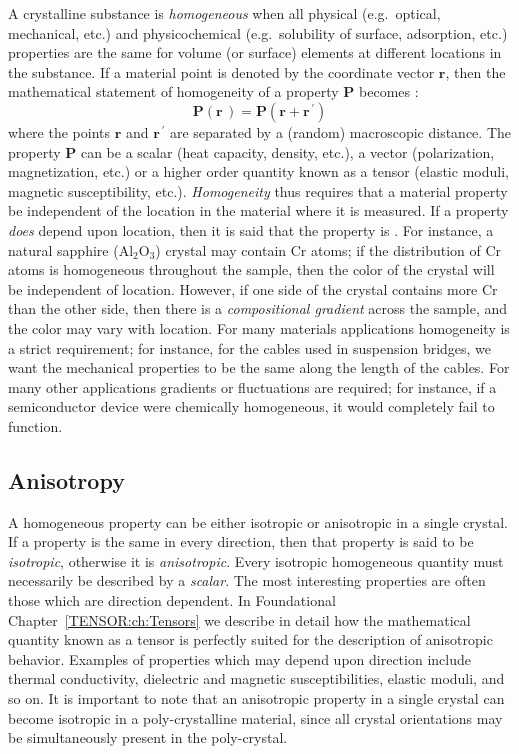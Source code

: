 A crystalline substance is \textit{homogeneous} when all physical (e.g.\ optical, mechanical, etc.)  and physicochemical (e.g.\ solubility of surface, adsorption, etc.)  properties are the same for volume (or surface) elements at different locations in the substance.  If a material point is denoted by the coordinate vector $\mathbf{r}$, then the mathematical statement of homogeneity of a property $\mathbf{P}$ becomes :
\begin{equation}
	\mathbf{P}(\mathbf{r}\,)=\mathbf{P}(\mathbf{r}+\mathbf{r}^{\,\prime})
\end{equation}
where the points $\mathbf{r}$ and $\mathbf{r}^{\,\prime}$ are separated by a (random) macroscopic distance.  The property $\mathbf{P}$ can be a scalar (heat capacity, density, etc.), a vector (polarization, magnetization, etc.)  or a higher order quantity known as a tensor (elastic moduli, magnetic susceptibility, etc.). \textit{Homogeneity} thus requires that a material property be independent of the location in the material where it is measured.  If a property \textit{does} depend upon location, then it is said that the property is .  For instance, a natural sapphire (Al$_2$O$_3$) crystal may contain Cr atoms; if the distribution of Cr atoms is homogeneous throughout the sample, then the color of the crystal will be independent of location.  However, if one side of the crystal contains more Cr than the other side, then there is a \textit{compositional gradient} across the sample, and the color may vary with location.  For many materials applications homogeneity is a strict requirement; for instance, for the cables used in suspension bridges, we want the mechanical properties to be the same along the length of the cables. For many other applications gradients or fluctuations are required;  for instance, if a semiconductor device were chemically homogeneous, it would completely fail to function.


\subsection{Anisotropy}
\label{\chabbr:ssec:anisotropy}

A homogeneous property can be either isotropic or anisotropic in a single crystal.  If a property is the same in every direction, then that property is said to be \textit{isotropic}, otherwise it is \textit{anisotropic}.  Every isotropic homogeneous quantity must necessarily be described by a \textit{scalar}.  The most interesting properties are often those which are direction dependent.  In Foundational Chapter~\ref{TENSOR:ch:Tensors} we describe in detail how the mathematical quantity known as a tensor is perfectly suited for the description of anisotropic behavior.  Examples of properties which may depend upon direction include thermal conductivity, dielectric and magnetic susceptibilities, elastic moduli, and so on.  It is important to note that an anisotropic property in a single crystal can become isotropic in a poly-crystalline material, since all crystal orientations may be simultaneously present in the poly-crystal.

